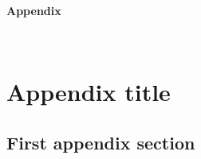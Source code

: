 
{
\cleardoublepage
\let\clearpage\relax
\begin{LARGE}
\textbf{Appendix}
\end{LARGE}\\
\noappendicestocpagenum
\renewcommand{\appendixtocname}{Appendix}
\renewcommand{\appendixpagename}{Appendix}
\appendix
\addappheadtotoc
\chapter{Appendix title}
\label{appendix:first-appendix}
\normalsize
}
\lipsum[1-5]
\section{First appendix section}
\lipsum[1-20]
